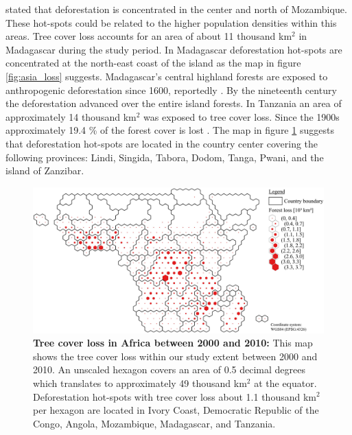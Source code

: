 stated that deforestation is concentrated in the center and north of Mozambique. These hot-spots could be related to the higher population densities within this areas. Tree cover loss accounts for an area of about 11 thousand km$^2$ in Madagascar during the study period. In Madagascar deforestation hot-spots are concentrated at the north-east coast of the island as the map in figure \ref{fig:asia_loss} suggests. Madagascar's central highland forests are exposed to anthropogenic deforestation since 1600, reportedly \citep{Harper2007}. By the nineteenth century the deforestation advanced over the entire island forests. In Tanzania an area of approximately 14 thousand km$^2$ was exposed to tree cover loss. Since the 1900s approximately 19.4 \% of the forest cover is lost \citep{Kideghesho2015}. The map in figure \ref{fig:africa_loss} suggests that deforestation hot-spots are located in the country center covering the following provinces: Lindi, Singida, Tabora, Dodom, Tanga, Pwani, and the island of Zanzibar.
			\begin{figure}[ht]
				\centering
				\includegraphics[scale=1.]{img/africa_loss_frameless}
				\caption[Tree cover loss in Africa between 2000 and 2010]{\textbf{Tree cover loss in Africa between 2000 and 2010:} This map shows the tree cover loss within our study extent between 2000 and 2010. An unscaled hexagon covers an area of 0.5 decimal degrees which translates to approximately 49 thousand km$^2$ at the equator. Deforestation hot-spots with tree cover loss about 1.1 thousand km$^2$ per hexagon are located in Ivory Coast, Democratic Republic of the Congo, Angola, Mozambique, Madagascar, and Tanzania.}
				\label{fig:africa_loss}
			\end{figure}

